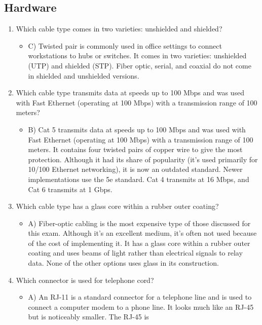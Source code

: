 \documentclass{article}
\begin{document}
\subsection{Hardware} 
\begin{enumerate}
    \item Which cable type comes in two varieties: unshielded and shielded?
    \begin{itemize}
        \item C) Twisted pair is commonly used in office settings to connect workstations to hubs or
switches. It comes in two varieties: unshielded (UTP) and shielded (STP). Fiber optic, serial,
and coaxial do not come in shielded and unshielded versions.
    \end{itemize}
    \item Which cable type transmits data at speeds up to 100 Mbps and was used with Fast Ethernet
(operating at 100 Mbps) with a transmission range of 100 meters?
    \begin{itemize}
        \item B) Cat 5 transmits data at speeds up to 100 Mbps and was used with Fast Ethernet (operating
at 100 Mbps) with a transmission range of 100 meters. It contains four twisted pairs of copper
wire to give the most protection. Although it had its share of popularity (it’s used primarily for
10/100 Ethernet networking), it is now an outdated standard. Newer implementations use the
5e standard. Cat 4 transmits at 16 Mbps, and Cat 6 transmits at 1 Gbps.
    \end{itemize}
    \item Which cable type has a glass core within a rubber outer coating?
    \begin{itemize}
        \item A) Fiber-optic cabling is the most expensive type of those discussed for this exam.
Although it’s an excellent medium, it’s often not used because of the cost of implementing
it. It has a glass core within a rubber outer coating and uses beams of light rather than
electrical signals to relay data. None of the other options uses glass in its construction.
    \end{itemize}
    \item Which connector is used for telephone cord?
    \begin{itemize}
        \item A) An RJ-11 is a standard connector for a telephone line and is used to connect a computer
modem to a phone line. It looks much like an RJ-45 but is noticeably smaller. The RJ-45 is

\end{itemize}
\end{enumerate}
\end{document}
